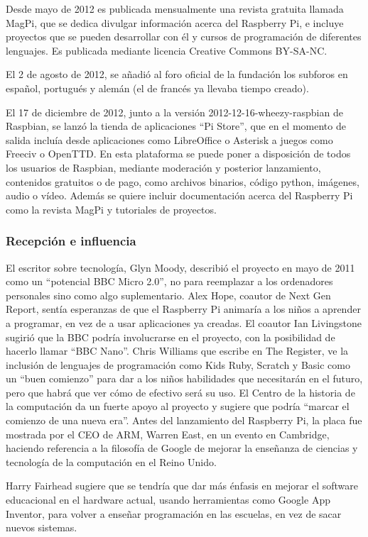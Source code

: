 \documentclass[a4paper,11pt,oneside]{book}
\begin{document}
Desde mayo de 2012 es publicada mensualmente una revista gratuita llamada MagPi, que se dedica divulgar información acerca del Raspberry Pi, e incluye proyectos que se pueden desarrollar con él y cursos de programación de diferentes lenguajes. Es publicada mediante licencia Creative Commons BY-SA-NC.

El 2 de agosto de 2012, se añadió al foro oficial de la fundación los subforos en español, portugués y alemán (el de francés ya llevaba tiempo creado).

El 17 de diciembre de 2012, junto a la versión 2012-12-16-wheezy-raspbian de Raspbian, se lanzó la tienda de aplicaciones ``Pi Store'', que en el momento de salida incluía desde aplicaciones como LibreOffice o Asterisk a juegos como Freeciv o OpenTTD. En esta plataforma se puede poner a disposición de todos los usuarios de Raspbian, mediante moderación y posterior lanzamiento, contenidos gratuitos o de pago, como archivos binarios, código python, imágenes, audio o vídeo. Además se quiere incluir documentación acerca del Raspberry Pi como la revista MagPi y tutoriales de proyectos.

\subsubsection{Recepción e influencia}

El escritor sobre tecnología, Glyn Moody, describió el proyecto en mayo de 2011 como un ``potencial BBC Micro 2.0'', no para reemplazar a los ordenadores personales sino como algo suplementario. Alex Hope, coautor de Next Gen Report, sentía esperanzas de que el Raspberry Pi animaría a los niños a aprender a programar, en vez de a usar aplicaciones ya creadas. El coautor Ian Livingstone sugirió que la BBC podría involucrarse en el proyecto, con la posibilidad de hacerlo llamar ``BBC Nano''. Chris Williams que escribe en The Register, ve la inclusión de lenguajes de programación como Kids Ruby, Scratch y Basic como un ``buen comienzo'' para dar a los niños habilidades que necesitarán en el futuro, pero que habrá que ver cómo de efectivo será su uso. El Centro de la historia de la computación da un fuerte apoyo al proyecto y sugiere que podría ``marcar el comienzo de una nueva era''. Antes del lanzamiento del Raspberry Pi, la placa fue mostrada por el CEO de ARM, Warren East, en un evento en Cambridge, haciendo referencia a la filosofía de Google de mejorar la enseñanza de ciencias y tecnología de la computación en el Reino Unido.

Harry Fairhead sugiere que se tendría que dar más énfasis en mejorar el software educacional en el hardware actual, usando herramientas como Google App Inventor, para volver a enseñar programación en las escuelas, en vez de sacar nuevos sistemas. 
\end{document}
